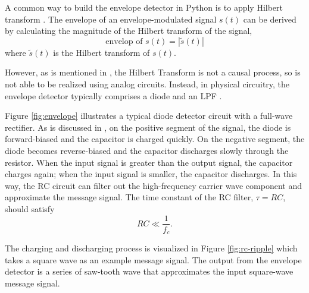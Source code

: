 \documentclass[../ECE459FinalProjectReport.tex]{subfiles}
\begin{document}
A common way to build the envelope detector in Python is to apply Hilbert transform \cite{ulrichEnvelopeCalculationHilbert2006, XiXiaoShengPythonTiQuXinHaoDeBaoLuoGet2023}. The envelope of an envelope-modulated signal $s\left(t\right)$ can be derived by calculating the magnitude of the Hilbert transform of the signal,
\begin{equation}
    \text{envelop of $s\left(t\right)$} = \left| \tilde{s}\left(t\right) \right|
\end{equation}
where $\tilde{s}(t)$ is the Hilbert transform of $s\left(t\right)$.

However, as is mentioned in \cite[p. 428]{kudekiAnalogSignalsSystems2009}, the Hilbert Transform is not a causal process, so is not able to be realized using analog circuits. Instead, in physical circuitry, the envelope detector typically comprises a diode and an LPF \cite{AnalogCommunicationAM}.

Figure \ref{fig:envelope} illustrates a typical diode detector circuit with a full-wave rectifier. As is discussed in \cite[pp. 111--112]{haykinIntroductionAnalogDigital2007}, on the positive segment of the signal, the diode is forward-biased and the capacitor is charged quickly. On the negative segment, the diode becomes reverse-biased and the capacitor discharges slowly through the resistor. When the input signal is greater than the output signal, the capacitor charges again; when the input signal is smaller, the capacitor discharges. In this way, the RC circuit can filter out the high-frequency carrier wave component and approximate the message signal. The time constant of the RC filter, $\tau=RC$, should satisfy
\begin{equation}
    RC\ll \frac{1}{f_c}.
\end{equation}

The charging and discharging process is visualized in Figure \ref{fig:rc-ripple} which takes a square wave as an example message signal. The output from the envelope detector is a series of saw-tooth wave that approximates the input square-wave message signal.
\end{document}
